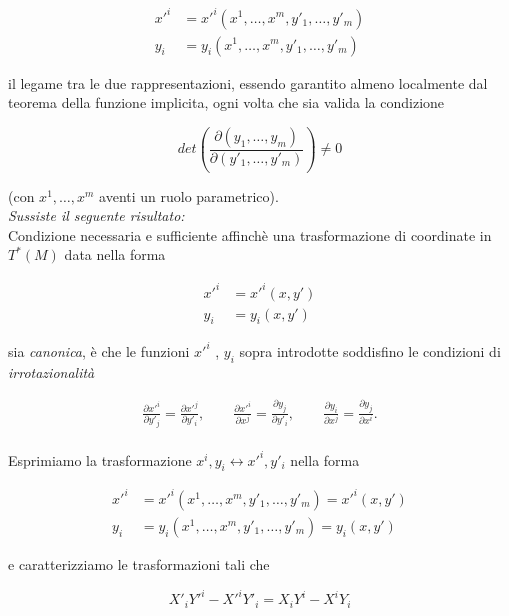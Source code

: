 \begin{align*}
x'^i &= x'^i(x^1, \dots , x^m, y'_1, \dots , y'_m)
\\
y_i &= y_i(x^1, \dots , x^m, y'_1, \dots , y'_m)
\end{align*}


il legame tra le due rappresentazioni, essendo garantito almeno localmente dal teorema della funzione implicita, ogni volta che sia valida la condizione

\begin{equation*}
det
\left( \frac{\partial (y_1, \dots, y_m)}{\partial (y'_1, \dots, y'_m)} \right)
\ne 0
\end{equation*}

(con $ x^1, \dots , x^m $ aventi un ruolo parametrico).
\\
\textit{Sussiste il seguente risultato:}\\
Condizione necessaria e sufficiente affinchè una trasformazione di coordinate in  $ T^* (M) $ data nella forma

\begin{align*}
x'^i &= x'^i(x,y')
\\
y_i &= y_i(x,y')
\end{align*}

sia \textit{canonica}, è che le funzioni $ x'^i $ , $ y_i $ sopra introdotte soddisfino le condizioni di \textit{irrotazionalità}

\begin{align*}
\frac{\partial x'^i}{\partial y'_j}=\frac{\partial x'^j}{\partial y'_i}, \qquad \frac{\partial x'^i}{\partial x^j}=\frac{\partial y_j}{\partial y'_i}, \qquad \frac{\partial y_i}{\partial x^j}=\frac{\partial y_j}{\partial x^i}.
\end{align*}
\\

Esprimiamo la trasformazione $ x^i, y_i \longleftrightarrow x'^i, y'_i $ nella forma

\begin{align*}
x'^i &= x'^i (x^1, \dots , x^m, y'_1, \dots , y'_m) = x'^i (x, y') \\
y_i &= y_i (x^1, \dots , x^m, y'_1, \dots , y'_m) = y_i (x, y')
\end{align*}

e caratterizziamo le trasformazioni tali che

\begin{equation*}
X'_i Y'^i - X'^i Y'_i = X_i Y^i - X^i Y_i
\end{equation*}

